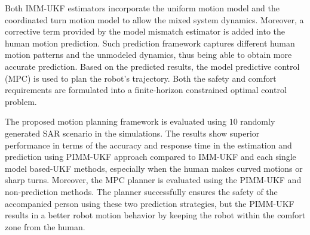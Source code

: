 \documentclass[journal]{IEEEtran}
\DeclareRobustCommand{\clnote}[1]{\ifthenelse{\boolean{include-notes}}%
{\textcolor{orange}{\textbf{CL: #1}}}{}}
\begin{document}
    Both IMM-UKF estimators incorporate the uniform motion model and the coordinated turn motion model to allow the mixed system dynamics. 
	Moreover, a corrective term provided by the model mismatch estimator is added into the human motion prediction.
        Such prediction framework captures different human motion patterns and the unmodeled dynamics, thus being able to obtain more accurate prediction.
	Based on the predicted results, the model predictive control (MPC) is used to plan the robot's trajectory. Both the safety and comfort requirements are formulated into a finite-horizon constrained optimal control problem.

	The proposed motion planning framework is evaluated using $10$ randomly generated SAR scenario in the simulations.
	The results show superior performance in terms of the accuracy and response time in the estimation and prediction using PIMM-UKF approach compared to IMM-UKF and each
    single model based-UKF methods, especially when the human makes curved motions or sharp turns.
	Moreover, the MPC planner is evaluated using the PIMM-UKF and non-prediction methods.
	The planner successfully ensures the safety of the accompanied person using these two prediction strategies, but the PIMM-UKF results in a better robot motion behavior by keeping the robot within the comfort zone from the human.
	
\end{document}

